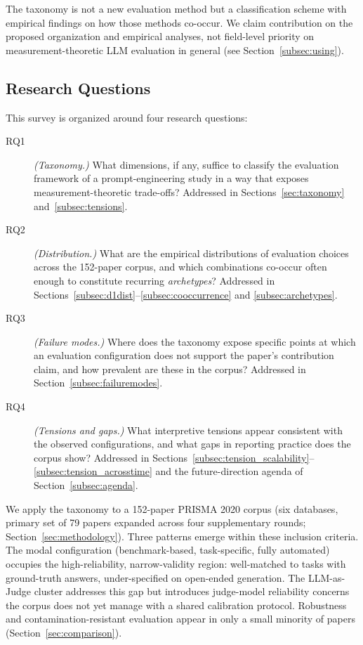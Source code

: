 \documentclass[acmsmall, nonacm, screen]{acmart}
\begin{document}
The taxonomy is not a new evaluation method but a classification
scheme with empirical findings on how those methods co-occur. We
claim contribution on the proposed organization and empirical
analyses, not field-level priority on measurement-theoretic LLM
evaluation in general (see Section~\ref{subsec:using}).

\subsection*{Research Questions}
\label{subsec:rqs}
This survey is organized around four research questions:
\begin{description}
\item[RQ1] \textit{(Taxonomy.)} What dimensions, if any, suffice to
classify the evaluation framework of a prompt-engineering study in a
way that exposes measurement-theoretic trade-offs? Addressed in
Sections~\ref{sec:taxonomy} and~\ref{subsec:tensions}.

\item[RQ2] \textit{(Distribution.)} What are the empirical
distributions of evaluation choices across the 152-paper corpus, and
which combinations co-occur often enough to constitute recurring
\textit{archetypes}? Addressed in
Sections~\ref{subsec:d1dist}--\ref{subsec:cooccurrence} and
\ref{subsec:archetypes}.

\item[RQ3] \textit{(Failure modes.)} Where does the taxonomy expose
specific points at which an evaluation configuration does not support
the paper's contribution claim, and how prevalent are these in the
corpus? Addressed in Section~\ref{subsec:failuremodes}.

\item[RQ4] \textit{(Tensions and gaps.)} What interpretive tensions
appear consistent with the observed configurations, and what gaps in
reporting practice does the corpus show? Addressed in
Sections~\ref{subsec:tension_scalability}--\ref{subsec:tension_acrosstime}
and the future-direction agenda of Section~\ref{subsec:agenda}.
\end{description}

We apply the taxonomy to a 152-paper PRISMA 2020 corpus (six
databases, primary set of 79 papers expanded across four
supplementary rounds; Section~\ref{sec:methodology}). Three patterns
emerge within these inclusion criteria. The modal configuration
(benchmark-based, task-specific, fully automated) occupies the
high-reliability, narrow-validity region: well-matched to tasks with
ground-truth answers, under-specified on open-ended generation. The
LLM-as-Judge cluster addresses this gap but introduces judge-model
reliability concerns the corpus does not yet manage with a shared
calibration protocol. Robustness and contamination-resistant
evaluation appear in only a small minority of papers
(Section~\ref{sec:comparison}).
\end{document}

